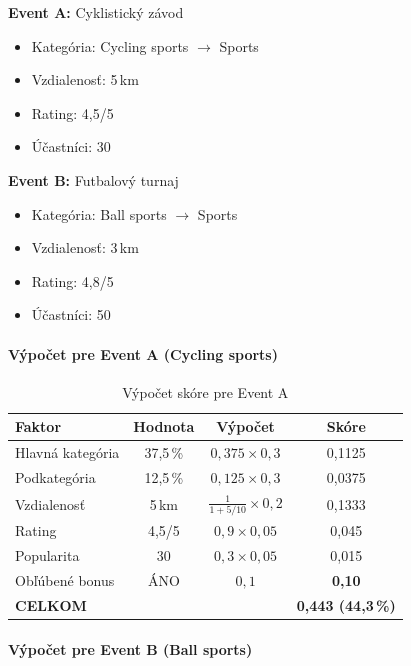 \textbf{Event A:} Cyklistický závod
\begin{itemize}
    \item Kategória: Cycling sports $\rightarrow$ Sports
    \item Vzdialenosť: 5\,km
    \item Rating: 4,5/5
    \item Účastníci: 30
\end{itemize}

\textbf{Event B:} Futbalový turnaj
\begin{itemize}
    \item Kategória: Ball sports $\rightarrow$ Sports
    \item Vzdialenosť: 3\,km
    \item Rating: 4,8/5
    \item Účastníci: 50
\end{itemize}

\paragraph{Výpočet pre Event A (Cycling sports)}

\begin{table}[H]
\centering
\begin{tabular}{|l|c|c|c|}
\hline
\textbf{Faktor} & \textbf{Hodnota} & \textbf{Výpočet} & \textbf{Skóre} \\
\hline
Hlavná kategória & 37,5\,\% & $0{,}375 \times 0{,}3$ & 0,1125 \\
\hline
Podkategória & 12,5\,\% & $0{,}125 \times 0{,}3$ & 0,0375 \\
\hline
Vzdialenosť & 5\,km & $\frac{1}{1+5/10} \times 0{,}2$ & 0,1333 \\
\hline
Rating & 4,5/5 & $0{,}9 \times 0{,}05$ & 0,045 \\
\hline
Popularita & 30 & $0{,}3 \times 0{,}05$ & 0,015 \\
\hline
Obľúbené bonus & ÁNO & $0{,}1$ & \textbf{0,10} \\
\hline
\textbf{CELKOM} & & & \textbf{0,443 (44,3\,\%)} \\
\hline
\end{tabular}
\caption{Výpočet skóre pre Event A}
\end{table}

\paragraph{Výpočet pre Event B (Ball sports)}

